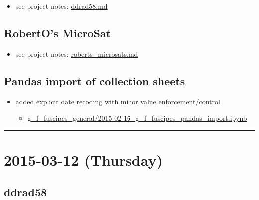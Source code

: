 \documentclass[letterpaper]{scrartcl}
\begin{document}
\begin{itemize}
\itemsep1pt\parskip0pt
\item
  see project notes:
  \href{file:///home/gus/Dropbox/repos/git/markdown-docs/notes/projects/ddrad58/ddrad58.md}{ddrad58.md}
\end{itemize}

\subsection{RobertO's MicroSat}\label{robertos-microsat-1}

\begin{itemize}
\itemsep1pt\parskip0pt
\item
  see project notes:
  \href{file:///home/gus/Dropbox/repos/git/markdown-docs/notes/projects/roberts_microsats/roberts_microsats.md}{roberts\_microsats.md}
\end{itemize}

\subsection{Pandas import of collection
sheets}\label{pandas-import-of-collection-sheets}

\begin{itemize}
\itemsep1pt\parskip0pt
\item
  added explicit date recoding with minor value enforcement/control

  \begin{itemize}
  \itemsep1pt\parskip0pt
  \item
    \href{file:///home/gus/Dropbox/repos/git/ipy_notebooks/YALE/g_f_fuscipes_general/2015-02-16_g_f_fuscipes_pandas_import.ipynb}{g\_f\_fuscipes\_general/2015-02-16\_g\_f\_fuscipes\_pandas\_import.ipynb}
  \end{itemize}
\end{itemize}

\begin{center}\rule{0.5\linewidth}{\linethickness}\end{center}

\section{2015-03-12 (Thursday)}\label{thursday-1}

\subsection{ddrad58}\label{ddrad58-2}
\end{document}
